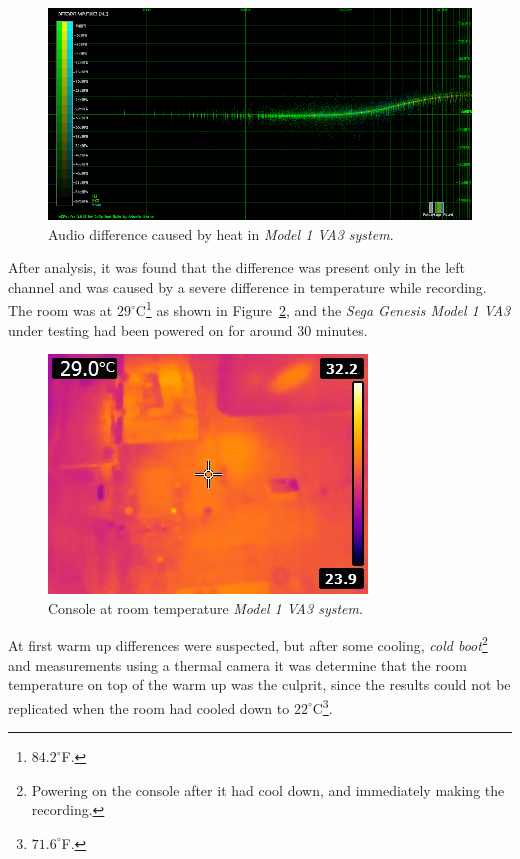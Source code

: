 \documentclass[10pt,a4paper]{report}
\begin{document}
\begin{appendices}
\begin{figure}[H]
	\centering
	\includegraphics[width=1.0\linewidth]{images/heat/0-plotheat.png}
	\caption[Heat Difference]{Audio difference caused by heat in \textit{Model 1 VA3 system}.}
	\label{fig:heatdiff}
\end{figure}

After analysis, it was found that the difference was present only in the left channel and was caused by a severe difference in temperature while recording. The room was at $29^\circ$C\footnote{$84.2^\circ$F.} as shown in Figure~\ref{fig:heatroomtemp}, and the \textit{Sega Genesis Model 1 VA3} under testing had been powered on for around 30 minutes.

\begin{figure}[H]
	\centering
	\includegraphics[width=0.4\linewidth]{images/heat/1-roomtemp.jpg}
	\caption[Room temperature]{Console at room temperature \textit{Model 1 VA3 system}.}
	\label{fig:heatroomtemp}
\end{figure}

At first warm up differences were suspected, but after some cooling, \textit{cold boot}\footnote{Powering on the console after it had cool down, and immediately making the recording.} and measurements using a thermal camera it was determine that the room temperature on top of the warm up was the culprit, since the results could not be replicated when the room had cooled down to $22^\circ$C\footnote{$71.6^\circ$F.}. 


\end{appendices}
\end{document}
